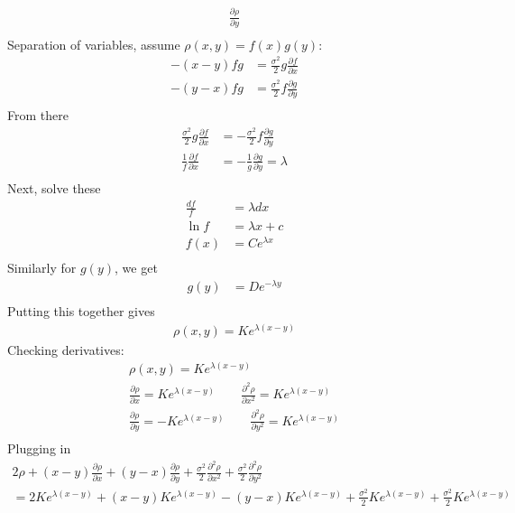 \documentclass[12pt]{article}
\theoremstyle{plain}
\theoremstyle{definition}
\theoremstyle{remark}
\begin{document}
\begin{enumerate}
\begin{enumerate}
\begin{align*}
            \frac{\partial \rho}{\partial y} \\
        \end{align*}
        Separation of variables, assume $\rho(x,y) = f(x) g(y)$:
        \begin{align*}
          -(x-y)fg &= \frac{\sigma^2 }{2}
          g \frac{\partial f}{\partial x}\\
          -(y-x)fg &= \frac{\sigma^2 }{2}
            f \frac{\partial g}{\partial y} \\
        \end{align*}
        From there
        \begin{align*}
          \frac{\sigma^2 }{2} g \frac{\partial f}{\partial x}
            &= -\frac{\sigma^2 }{2} f \frac{\partial g}{\partial y} \\
          \frac{1}{f}\frac{\partial f}{\partial x}
            &= -\frac{1}{g} \frac{\partial g}{\partial y}
            = \lambda \\
        \end{align*}
        Next, solve these
        \begin{align*}
          \frac{d f}{f} &= \lambda dx\\
          \ln f &= \lambda x + c\\
          f(x) &= Ce^{\lambda x}\\
        \end{align*}
        Similarly for $g(y)$, we get
        \begin{align*}
          g(y) &= De^{-\lambda y}\\
        \end{align*}
        Putting this together gives
        \begin{align*}
          \rho(x,y) = K e^{\lambda (x-y)}
        \end{align*}
        Checking derivatives:
        \begin{align*}
          \rho(x,y) = K e^{\lambda (x-y)}\\
          \frac{\partial \rho}{\partial x} = K e^{\lambda (x-y)}
          \qquad
          \frac{\partial^2 \rho}{\partial x^2} = K e^{\lambda (x-y)}\\
          \frac{\partial \rho}{\partial y} = -K e^{\lambda (x-y)}
          \qquad
          \frac{\partial^2 \rho}{\partial y^2} = K e^{\lambda (x-y)}\\
        \end{align*}
        Plugging in
        \begin{align*}
          2\rho + (x-y)\frac{\partial\rho}{\partial x}
          + (y-x)\frac{\partial\rho}{\partial y}
          + \frac{\sigma^2 }{2} \frac{\partial^2 \rho}{\partial x^2}
          + \frac{\sigma^2 }{2} \frac{\partial^2 \rho}{\partial y^2} \\
          =
          2K e^{\lambda (x-y)}
          + (x-y)K e^{\lambda (x-y)}
          - (y-x)K e^{\lambda (x-y)}
          + \frac{\sigma^2 }{2}K e^{\lambda (x-y)}
          + \frac{\sigma^2 }{2}K e^{\lambda (x-y)}
        \end{align*}


\end{enumerate}
\end{enumerate}
\end{document}
